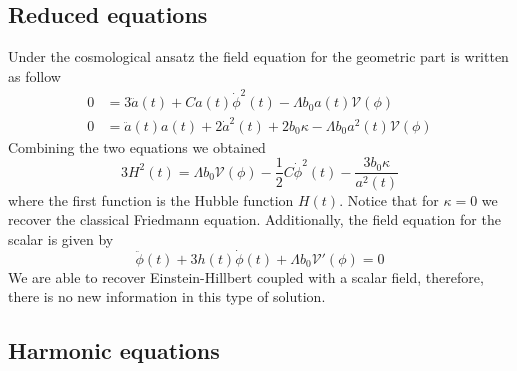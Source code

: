 \documentclass[10pt,a4paper]{article}
\begin{document}
\subsection{Reduced equations}

Under the cosmological ansatz the field equation for the geometric part is written as follow
\begin{align}
  0 & = 3\ddot{a}(t) + C a(t)\dot{\phi}^{2}(t) - \Lambda b_0 a(t)\mathcal{V}(\phi) \\
  0 & = \ddot{a}(t)a(t) + 2\dot{a}^2(t) + 2b_0\kappa - \Lambda b_0 a^2(t)\mathcal{V}(\phi)
  \end{align}
Combining the two equations we obtained
\begin{equation}
  3H^2(t) = \Lambda b_0 \mathcal{V}(\phi) -\frac{1}{2}C \dot{\phi}^2(t) - \frac{3b_0\kappa}{a^2(t)}
\end{equation}
where the first function is the Hubble function $H(t)$. Notice that for $\kappa = 0$ we recover the classical Friedmann equation. Additionally,
the field equation for the scalar is given by
\begin{equation}
  \ddot{\phi}(t) + 3h(t)\dot{\phi}(t) + \Lambda b_0 \mathcal{V}'(\phi) = 0
\end{equation}
We are able to recover Einstein-Hillbert coupled with a scalar field, therefore, there is no new information in this type of solution.


\subsection{Harmonic equations}
\end{document}
